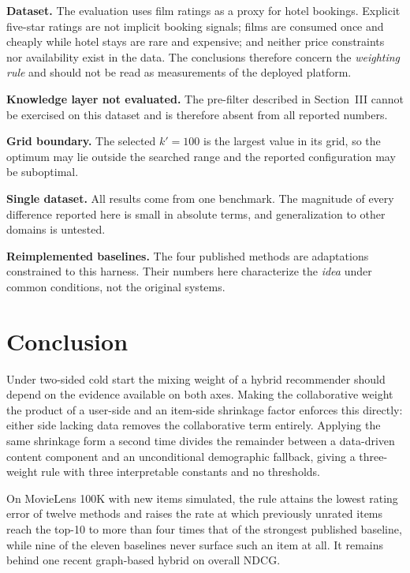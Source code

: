 \documentclass[conference]{IEEEtran}
\begin{document}
\textbf{Dataset.} The evaluation uses film ratings as a proxy for
hotel bookings. Explicit five-star ratings are not implicit booking
signals; films are consumed once and cheaply while hotel stays are
rare and expensive; and neither price constraints nor availability
exist in the data. The conclusions therefore concern the
\emph{weighting rule} and should not be read as measurements of the
deployed platform.

\textbf{Knowledge layer not evaluated.} The pre-filter described in
Section~III cannot be exercised on this dataset and is therefore
absent from all reported numbers.

\textbf{Grid boundary.} The selected $k' = 100$ is the largest value
in its grid, so the optimum may lie outside the searched range and
the reported configuration may be suboptimal.

\textbf{Single dataset.} All results come from one benchmark. The
magnitude of every difference reported here is small in absolute
terms, and generalization to other domains is untested.

\textbf{Reimplemented baselines.} The four published methods are
adaptations constrained to this harness. Their numbers here
characterize the \emph{idea} under common conditions, not the
original systems.

\section{Conclusion}

Under two-sided cold start the mixing weight of a hybrid recommender
should depend on the evidence available on both axes. Making the
collaborative weight the product of a user-side and an item-side
shrinkage factor enforces this directly: either side lacking data
removes the collaborative term entirely. Applying the same shrinkage
form a second time divides the remainder between a data-driven
content component and an unconditional demographic fallback, giving
a three-weight rule with three interpretable constants and no
thresholds.

On MovieLens 100K with new items simulated, the rule attains the
lowest rating error of twelve methods and raises the rate at which
previously unrated items reach the top-10 to more than four times
that of the strongest published baseline, while nine of the eleven
baselines never surface such an item at all. It remains behind one
recent graph-based hybrid on overall NDCG.
\end{document}
